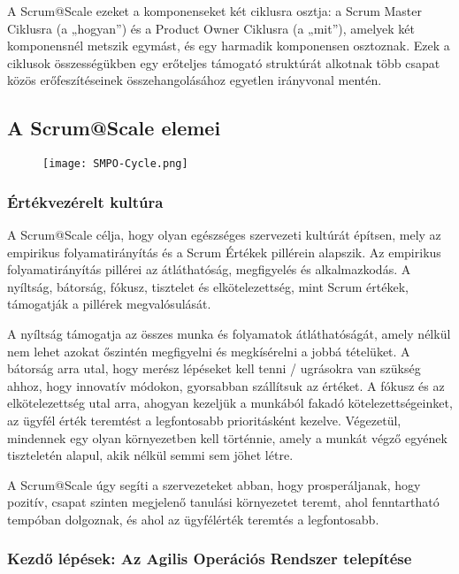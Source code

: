 \documentclass[12pt,a4paper,parskip=full]{scrartcl}
\begin{document}
A Scrum@Scale ezeket a komponenseket két ciklusra osztja: a Scrum Master Ciklusra (a „hogyan”) és a Product Owner Ciklusra (a „mit”), amelyek két komponensnél metszik egymást, és egy harmadik komponensen osztoznak. Ezek a ciklusok összességükben egy erőteljes támogató struktúrát alkotnak több csapat közös erőfeszítéseinek összehangolásához egyetlen irányvonal mentén.

\subsection{A Scrum@Scale elemei}\label{the-components-of-scrumatscale}
\begin{figure}[H]
    \centering
    \texttt{[image: SMPO-Cycle.png]}
\end{figure}

\subsubsection{Értékvezérelt kultúra}\label{values-driven-culture}

A Scrum@Scale célja, hogy olyan egészséges szervezeti kultúrát építsen, mely az empirikus folyamatirányítás és a Scrum Értékek pillérein alapszik. Az empirikus folyamatirányítás pillérei az átláthatóság, megfigyelés és alkalmazkodás. A nyíltság, bátorság, fókusz, tisztelet és elkötelezettség, mint Scrum értékek, támogatják a pillérek megvalósulását.

A nyíltság támogatja az összes munka és folyamatok átláthatóságát, amely nélkül nem lehet azokat őszintén megfigyelni és megkísérelni a jobbá tételüket. A bátorság arra utal, hogy merész lépéseket kell tenni / ugrásokra van szükség ahhoz, hogy innovatív módokon, gyorsabban szállítsuk az értéket. A fókusz és az elkötelezettség utal arra, ahogyan kezeljük a munkából fakadó kötelezettségeinket, az ügyfél érték teremtést a legfontosabb prioritásként kezelve. Végezetül, mindennek egy olyan környezetben kell történnie, amely a munkát végző egyének tiszteletén alapul, akik nélkül semmi sem jöhet létre.

A Scrum@Scale úgy segíti a szervezeteket abban, hogy prosperáljanak, hogy pozitív, csapat szinten megjelenő tanulási környezetet teremt, ahol fenntartható tempóban dolgoznak, és ahol az ügyfélérték teremtés a legfontosabb.

\subsubsection{Kezdő lépések: Az Agilis Operációs Rendszer telepítése}\label{getting-started-installing-an-agile-operating-system}
\end{document}
